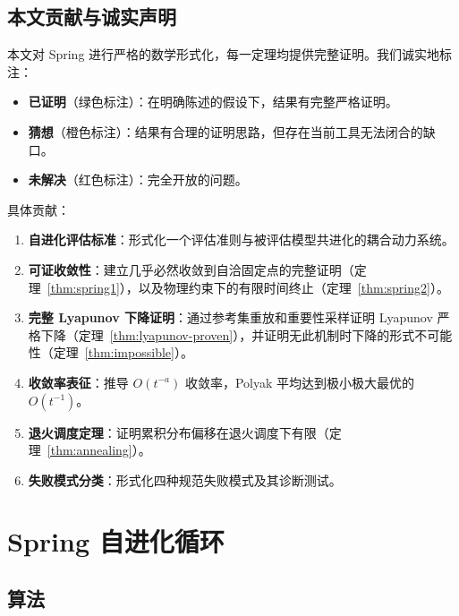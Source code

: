 \subsection{本文贡献与诚实声明}

本文对 Spring 进行严格的数学形式化，每一定理均提供完整证明。我们诚实地标注：
\begin{itemize}[nosep]
    \item \textbf{已证明}（绿色标注）：在明确陈述的假设下，结果有完整严格证明。
    \item \textbf{猜想}（橙色标注）：结果有合理的证明思路，但存在当前工具无法闭合的缺口。
    \item \textbf{未解决}（红色标注）：完全开放的问题。
\end{itemize}

具体贡献：
\begin{enumerate}[nosep]
    \item \textbf{自进化评估标准}：形式化一个评估准则与被评估模型共进化的耦合动力系统。
    \item \textbf{可证收敛性}：建立几乎必然收敛到自洽固定点的完整证明（定理~\ref{thm:spring1}），以及物理约束下的有限时间终止（定理~\ref{thm:spring2}）。
    \item \textbf{完整 Lyapunov 下降证明}：通过参考集重放和重要性采样证明 Lyapunov 严格下降（定理~\ref{thm:lyapunov-proven}），并证明无此机制时下降的形式不可能性（定理~\ref{thm:impossible}）。
    \item \textbf{收敛率表征}：推导 $O(t^{-a})$ 收敛率，Polyak 平均达到极小极大最优的 $O(t^{-1})$。
    \item \textbf{退火调度定理}：证明累积分布偏移在退火调度下有限（定理~\ref{thm:annealing}）。
    \item \textbf{失败模式分类}：形式化四种规范失败模式及其诊断测试。
\end{enumerate}

\section{Spring 自进化循环}

\subsection{算法}

